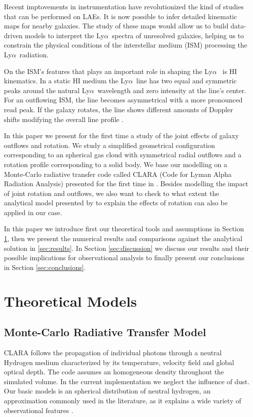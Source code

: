 \documentclass[a4paper,fleqn,usenatbib]{mnras}
\newcommand{\lya}{\ifmmode{{\rm Ly}\alpha}\else Ly$\alpha$\ \fi}
\begin{document}
Recent imptovements in instrumentation have revolutionized the kind of
studies that can be performed on LAEs.  
It is now possible to infer detailed kinematic maps for nearby galaxies.
The study of these maps would allow us to build data-driven models to
interpret the \lya spectra of unresolved galaxies, helping us to
constrain the physical conditions of the interstellar medium (ISM)
processing the \lya radiation.

On the ISM's features that plays an important role in shaping the \lya
is HI kinematics. 
In a static HI medium the \lya line has  two equal and symmetric peaks
around the natural \lya wavelength and zero intensity at the line's
center.
For an outflowing ISM, the line becomes
asymmetrical with a more pronounced read peak.
If the galaxy rotates, the line shows different amounts of Doppler
shifts modifying the overall line profile \cite{Garavito14}.

In this paper we present for the first time a study of the joint
effects of galaxy outflows and rotation.
We study a simplified geometrical configuration corresponding to an
spherical gas cloud with symmetrical radial outflows and a rotation
profile corresponding to a solid body.
We base our modelling on a Monte-Carlo radiative transfer code called
CLARA (Code for Lyman Alpha Radiation Analysis) presented for the
first time in \cite{CLARA}.
Besides modelling the impact of joint rotation and outflows, we also
want to check to what extent the analytical model presented by
\cite{Garavito14} to explain the effects of rotation can also be
applied in our case.

In this paper we introduce first our theoretical tools and assumptions
in Section \ref{sec:theory}, then we present the numerical results and
comparisons against the analytical solution in \ref{sec:results}.
In Section \ref{sec:discussion} we discuss our results and their
possible implications for observational analysis to finally present
our conclusions in Section \ref{sec:conclusions}.


\section{Theoretical Models}
\label{sec:theory}

\subsection{Monte-Carlo Radiative Transfer Model}

CLARA follows the propagation of individual photons through a neutral
Hydrogen medium characterized by its temperature, velocity field and
global optical depth.
The code assumes an homogeneous density throughout the simulated
volume.
In the current implementation we neglect the influence of dust.
Our basic models is an spherical distribution of neutral hydrogen,
an approximation commonly used in the literature, as it explains a
wide variety of observational features \citep{Ahn03,Verhamme06,Dijkstra06}.
\end{document}
